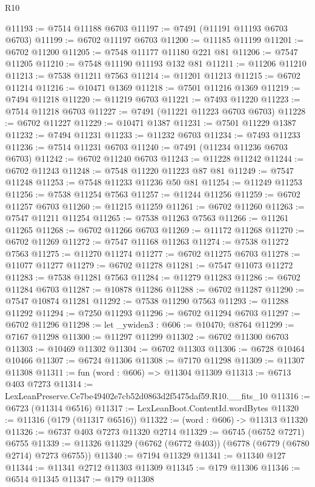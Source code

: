 \begin{lexlean}{R10}
\begin{coremodule}
@11193 := @7514 @11188 @6703
@11197 := @7491 (@11191 @11193 @6703 @6703)
@11199 := @6702 @11197 @6703
@11200 := @11185 @11199
@11201 := @6702 @11200
@11205 := @7548 @11177 @11180 @221 @81
@11206 := @7547 @11205
@11210 := @7548 @11190 @11193 @132 @81
@11211 := @11206 @11210
@11213 := @7538 @11211 @7563
@11214 := @11201 @11213
@11215 := @6702 @11214
@11216 := @10471 @1369
@11218 := @7501 @11216 @1369
@11219 := @7494 @11218
@11220 := @11219 @6703
@11221 := @7493 @11220
@11223 := @7514 @11218 @6703
@11227 := @7491 (@11221 @11223 @6703 @6703)
@11228 := @6702 @11227
@11229 := @10471 @1387
@11231 := @7501 @11229 @1387
@11232 := @7494 @11231
@11233 := @11232 @6703
@11234 := @7493 @11233
@11236 := @7514 @11231 @6703
@11240 := @7491 (@11234 @11236 @6703 @6703)
@11242 := @6702 @11240 @6703
@11243 := @11228 @11242
@11244 := @6702 @11243
@11248 := @7548 @11220 @11223 @87 @81
@11249 := @7547 @11248
@11253 := @7548 @11233 @11236 @50 @81
@11254 := @11249 @11253
@11256 := @7538 @11254 @7563
@11257 := @11244 @11256
@11259 := @6702 @11257 @6703
@11260 := @11215 @11259
@11261 := @6702 @11260
@11263 := @7547 @11211 @11254
@11265 := @7538 @11263 @7563
@11266 := @11261 @11265
@11268 := @6702 @11266 @6703
@11269 := @11172 @11268
@11270 := @6702 @11269
@11272 := @7547 @11168 @11263
@11274 := @7538 @11272 @7563
@11275 := @11270 @11274
@11277 := @6702 @11275 @6703
@11278 := @11077 @11277
@11279 := @6702 @11278
@11281 := @7547 @11073 @11272
@11283 := @7538 @11281 @7563
@11284 := @11279 @11283
@11286 := @6702 @11284 @6703
@11287 := @10878 @11286
@11288 := @6702 @11287
@11290 := @7547 @10874 @11281
@11292 := @7538 @11290 @7563
@11293 := @11288 @11292
@11294 := @7250 @11293
@11296 := @6702 @11294 @6703
@11297 := @6702 @11296
@11298 := let _ywiden3 : @606 := @10470; @8764
@11299 := @7167 @11298
@11300 := @11297 @11299
@11302 := @6702 @11300 @6703
@11303 := @10469 @11302
@11304 := @6702 @11303
@11306 := @6728 @10464 @10466
@11307 := @6724 @11306
@11308 := @7170 @11298
@11309 := @11307 @11308
@11311 := fun (word : @606) => @11304 @11309
@11313 := @6713 @403 @7273
@11314 := LexLeanPreserve.Ce7be49402e7cb52d0863d2f5475daf59.R10.__fits_10
@11316 := @6723 (@11314 @6516)
@11317 := LexLeanBoot.ContentId.wordBytes
@11320 := @11316 (@179 (@11317 @6516))
@11322 := (word : @606) -> @11313 @11320
@11326 := @6737 @403 @7273 @11320 @2714
@11329 := @6745 (@6752 @7271) @6755
@11339 := @11326 @11329 (@6762 (@6772 @403)) (@6778 (@6779 (@6780 @2714) @7273 @6755))
@11340 := @7194 @11329
@11341 := @11340 @127
@11344 := @11341 @2712 @11303 @11309
@11345 := @179 @11306
@11346 := @6514 @11345
@11347 := @179 @11308

\end{coremodule}
\end{lexlean}
